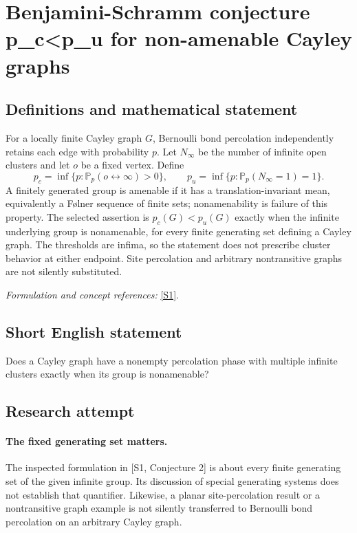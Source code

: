 \documentclass[11pt]{article}
\begin{document}
\section*{\texorpdfstring{Benjamini-Schramm conjecture p\_c<p\_u for non-amenable Cayley graphs}{Benjamini-Schramm conjecture p\_c<p\_u for non-amenable Cayley graphs}}\label{360}
\subsection{Definitions and mathematical statement}
For a locally finite Cayley graph $G$, Bernoulli bond percolation independently retains each edge with probability $p$. Let $N_\infty$ be the number of infinite open clusters and let $o$ be a fixed vertex. Define
\[
 p_c=\inf\{p:{\mathbb{P}}_p(o\leftrightarrow\infty)>0\},\qquad
 p_u=\inf\{p:{\mathbb{P}}_p(N_\infty=1)=1\}.
\]
A finitely generated group is amenable if it has a translation-invariant mean, equivalently a F\o lner sequence of finite sets; nonamenability is failure of this property. The selected assertion is $p_c(G)<p_u(G)$ exactly when the infinite underlying group is nonamenable, for every finite generating set defining a Cayley graph. The thresholds are infima, so the statement does not prescribe cluster behavior at either endpoint. Site percolation and arbitrary nontransitive graphs are not silently substituted.
\par\smallskip\textit{Formulation and concept references:} \href{https://ar5iv.labs.arxiv.org/html/1712.04651}{[S1]}.

\subsection{Short English statement}
Does a Cayley graph have a nonempty percolation phase with multiple infinite clusters exactly when its group is nonamenable?
\subsection{Research attempt}
\paragraph{The fixed generating set matters.}
The inspected formulation in [S1, Conjecture 2] is about every
finite generating set of the given infinite group. Its discussion
of special generating systems does not establish that quantifier.
Likewise, a planar site-percolation result or a nontransitive graph
example is not silently transferred to Bernoulli bond percolation
on an arbitrary Cayley graph.
\end{document}
